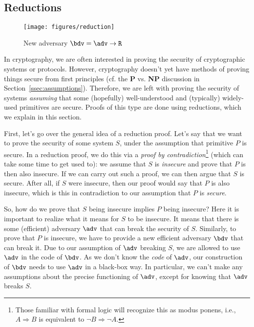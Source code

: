 \subsection{Reductions}

\begin{wrapfigure}{R}{0.6\textwidth}
\vspace{-0.5cm}
\begin{center}
\texttt{[image: figures/reduction]}
\caption{\label{fig:reduction-example}New adversary $\bdv=\adv\circ\M{R}$}
\end{center}
\vspace{-0.5cm}
\end{wrapfigure}

In cryptography, we are often interested in proving the security of cryptographic systems or protocols. However, cryptography doesn't yet have methods of proving things secure from first principles (cf. the \textbf{P} vs. \textbf{NP} discussion in Section~\ref{ssec:assumptions}). Therefore, we are left with proving the security of systems \emph{assuming} that some (hopefully) well-understood and (typically) widely-used primitives are secure. Proofs of this type are done using reductions, which we explain in this section.

First, let's go over the general idea of a reduction proof.
Let's say that we want to prove the security of some system $S$, under the assumption that primitive $P$ is secure. In a reduction proof, we do this via a \emph{proof by contradiction}\footnote{Those familiar with formal logic will recognize this as modus ponens, i.e., $A\Rightarrow B$ is equivalent to $\neg B\Rightarrow \neg A$.} (which can take some time to get used to): we assume that $S$ is \emph{insecure} and prove that $P$ is then also insecure. If we can carry out such a proof, we can then argue that $S$ is secure. After all, if $S$ were insecure, then our proof would say that $P$ is also insecure, which is this in contradiction to our assumption that $P$ is \emph{secure}.

So, how do we prove that $S$ being insecure implies $P$ being insecure? Here it is important to realize what it means for $S$ to be insecure. It means that there is some (efficient) adversary $\adv$ that can break the security of $S$. Similarly, to prove that $P$ is insecure, we have to provide a new efficient adversary $\bdv$ that can break it. Due to our assumption of $\adv$ breaking $S$, we are allowed to use $\adv$ in the code of $\bdv$. As we don't know the \emph{code} of $\adv$, our construction of $\bdv$ needs to use $\adv$ in a black-box way. In particular, we can't make any assumptions about the precise functioning of $\adv$, except for knowing that $\adv$ breaks $S$.


